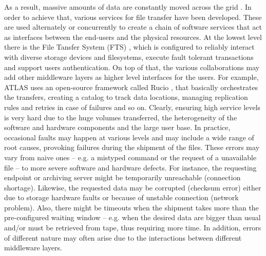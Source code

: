 
As a result, massive amounts of data are constantly moved across the grid%
. 
In order to achieve that, various services for file transfer have been developed. These are used alternately or concurrently to create a chain of software services that act as interfaces between the end-users and the physical resources.
At the lowest level there is the File Tansfer System (FTS) \cite{karavakis2020fts}, which is configured to reliably interact with diverse storage devices and filesystems, execute fault tolerant transactions and support users authentication.
On top of that, the various collaborations may add other middleware layers as higher level interfaces for the users.
For example, ATLAS uses an open-source framework called Rucio \cite{barisits2019rucio}, that basically orchestrates the transfers, creating a catalog to track data locations, managing replication rules and retries in case of failures and so on.
Clearly, ensuring high service levels is very hard due to the huge volumes transferred, the heterogeneity of the software and hardware components and the large user base.
In practice, occasional faults may happen at various levels and may include a wide range of root causes, provoking failures during the shipment of the files.
These errors may vary from naive ones -- e.g. a mistyped command or the request of a unavailable file -- to more severe software and hardware defects.
For instance, the requesting endpoint or archiving server might be temporarily unreachable (connection shortage).
Likewise, the requested data may be corrupted (checksum error) either due to storage hardware faults or because of unstable connection (network problem).
Also, there might be timeouts when the shipment takes more than the pre-configured waiting window -- e.g. when the desired data are bigger than usual and/or must be retrieved from tape, thus requiring more time.
In addition, errors of different nature may often arise due to the interactions between different middleware layers.
